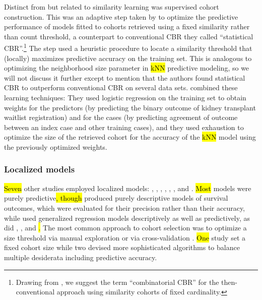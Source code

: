\documentclass[sn-mathphys,Numbered,pdflatex]{sn-jnl}
\theoremstyle{remark}
\theoremstyle{definition}
\begin{document}
Distinct from but related to similarity learning was supervised cohort
construction. This was an adaptive step taken by \citet{Park2006} to
optimize the predictive performance of models fitted to cohorts
retrieved using a fixed similarity rather than count threshold, a
counterpart to conventional CBR they called ``statistical
CBR''.\footnote{Drawing from \citet{Goyal2008}, we suggest the term
  ``combinatorial CBR'' for the then-conventional approach using
  similarity cohorts of fixed cardinality.} The step used a heuristic
procedure to locate a similarity threshold that (locally) maximizes
predictive accuracy on the training set. This is analogous to optimizing
the neighborhood size parameter in \hl{kNN} predictive modeling, so we will
not discuss it further except to mention that the authors found
statistical CBR to outperform conventional CBR on several data sets.
\citet{CampilloGimenez2013} combined these learning techniques: They
used logistic regression on the training set to obtain weights for the
predictors (by predicting the binary outcome of kidney transplant
waitlist registration) and for the cases (by predicting agreement of
outcome between an index case and other training cases), and they used
exhaustion to optimize the size of the retrieved cohort for the accuracy
of the \hl{kNN} model using the previously optimized weights.

\subsubsection{Localized models}\label{localized-models}

\hl{Seven} other studies employed localized models:
\citet{Mariuzzi1997}, \citet{Lee2015}, \citet{Verma2015},
\citet{Wang2019}, \citet{Ma2020}, \citet{Liu2022}, and
\citet{Doborjeh2022}. \hl{Most} models were purely
predictive\hl{, though} \citet{Mariuzzi1997} produced purely descriptive
models of survival outcomes, which were evaluated for their precision
rather than their accuracy, while \citet{Ng2015} used generalized
regression models descriptively as well as predictively, as did
\citet{Tang2021}, \citet{Ng2021}, and \citet{Liu2022}\hl{.} The most
common approach to cohort selection was to optimize a size threshold via
manual exploration
\citep{Mariuzzi1997, Lee2015, Ng2015, Lee2017, Wang2019, Vilhena2016} or
via cross-validation \citep{Lowsky2013, Verma2015}. \hl{One} study
\citep{Ma2020} set a fixed cohort size while two
\citep{Liang2015, Tang2021, Ng2021} devised more sophisticated
algorithms to balance multiple desiderata including predictive accuracy.
\end{document}
